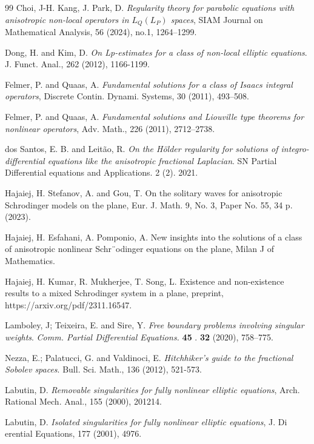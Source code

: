 \documentclass[10pt, leqno]{article}
\theoremstyle{definition}
\theoremstyle{remark}
\numberwithin{equation}{section}
\begin{document}
\begin{thebibliography}{99}
 Choi, J-H. Kang, J. Park, D. \textit{Regularity theory for parabolic equations with anisotropic non-local operators in $L_{Q}(L_{P})$ spaces}, SIAM Journal on Mathematical Analysis, 56 (2024), no.1, 1264--1299.

 Dong, H. and Kim, D. \textit{On Lp-estimates for a class of non-local elliptic equations}. J. Funct.
Anal., 262 (2012), 1166-1199.

 Felmer, P. and Quaas, A. \textit{Fundamental solutions for a class of Isaacs integral operators}, Discrete Contin. Dynami. Systems, 30 (2011), 493--508.

 Felmer, P. and Quaas, A. \textit{Fundamental solutions and Liouville type theorems for nonlinear operators}, Adv. Math., 226 (2011), 2712--2738.

 dos Santos, E. B. and Leit\~ao, R. \textit{On the H\" older regularity for solutions of integro-differential equations like the anisotropic fractional Laplacian}. SN Partial Differential equations and Applications. 2 (2). 2021.

 Hajaiej, H. Stefanov, A. and Gou, T. On the solitary waves for anisotropic Schrodinger models on the plane, Eur. J.
Math. 9, No. 3, Paper No. 55, 34 p. (2023).

 Hajaiej, H. Esfahani, A. Pomponio, A. New insights into the solutions of a class of anisotropic nonlinear Schr¨odinger
equations on the plane,  Milan J of Mathematics.

 Hajaiej, H. Kumar, R. Mukherjee, T. Song, L. Existence and non-existence results to a mixed Schrodinger system in a plane,
preprint,  https://arxiv.org/pdf/2311.16547.

 Lamboley, J; Teixeira, E. and Sire, Y. \textit{Free boundary problems involving singular weights}. \textit{Comm. Partial Differential Equations.} \textbf{45} . \textbf{32} (2020), 758--775.

 Nezza, E.; Palatucci, G. and Valdinoci, E. \textit{Hitchhiker's guide to the fractional Sobolev spaces}. Bull. Sci. Math., 136 (2012), 521-573.

 Labutin, D. \textit{Removable singularities for fully nonlinear elliptic equations}, Arch. Rational Mech. Anal., 155 (2000), 201214.

 Labutin, D. \textit{Isolated singularities for fully nonlinear elliptic equations}, J. Di erential Equations, 177 (2001), 4976.


\end{thebibliography}
\end{document}
